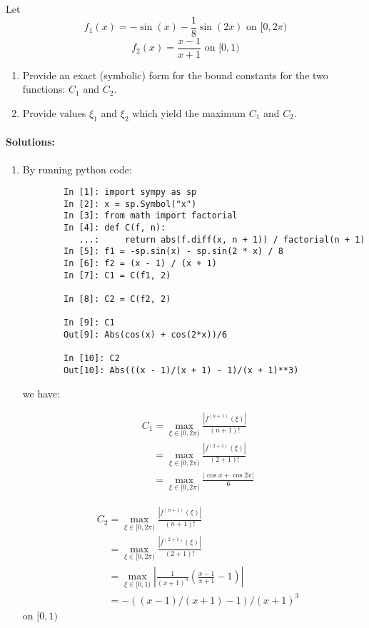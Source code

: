 \documentclass[11pt]{article}
\begin{document}
	Let \[f_1(x) = -\sin(x)-\frac{1}{8}\sin(2x) \textrm{\ on\ }[0, 2\pi)\]
		\[f_2(x) = \frac{x - 1}{x + 1}\textrm{\ on\ }[0, 1)\]
	\begin{enumerate}
		\item Provide an exact (symbolic) form for the bound constants for the two functions: $C_1$ and $C_2$.
		\item Provide values $\xi_1$ and $\xi_2$ which yield the maximum $C_1$ and $C_2$.
	\end{enumerate}
	
	\paragraph{Solutions:}
	\begin{enumerate}
		\item 
		By running python code:
		
		\begin{lstlisting}
		In [1]: import sympy as sp
		In [2]: x = sp.Symbol("x")
		In [3]: from math import factorial
		In [4]: def C(f, n):
   		   ...:     return abs(f.diff(x, n + 1)) / factorial(n + 1)
		In [5]: f1 = -sp.sin(x) - sp.sin(2 * x) / 8
		In [6]: f2 = (x - 1) / (x + 1)
		In [7]: C1 = C(f1, 2)

		In [8]: C2 = C(f2, 2)

		In [9]: C1
		Out[9]: Abs(cos(x) + cos(2*x))/6

		In [10]: C2
		Out[10]: Abs(((x - 1)/(x + 1) - 1)/(x + 1)**3)
		\end{lstlisting}
		
		we have:

		\begin{align}
			&C_1 = \max_{\xi \in [0,2\pi)} \frac{|f^{(n + 1)}(\xi)|}{(n + 1)!}\nonumber\\
			&\phantom{C_1} = \max_{\xi \in [0,2\pi)} \frac{|f^{(2 + 1)}(\xi)|}{(2 + 1)!}\nonumber\\
			&\phantom{C_1} = \max_{\xi \in [0,2\pi)} \frac{|\cos{x} + \cos{2x}|}{6}\nonumber
		\end{align}
		
		\begin{align}
			&C_2 = \max_{\xi \in [0,2\pi)} \frac{|f^{(n + 1)}(\xi)|}{(n + 1)!}\nonumber\\
			&\phantom{C_2} = \max_{\xi \in [0,2\pi)} \frac{|f^{(2 + 1)}(\xi)|}{(2 + 1)!}\nonumber\\
			&\phantom{C_2} = \max_{\xi\in [0, 1)} \left\lvert \frac{1}{(x + 1)^3}\left(\frac{x - 1}{x + 1} - 1\right)\right\rvert\nonumber\\
			&\phantom{C_2} = -((x - 1)/(x + 1) - 1)/(x + 1)^3\nonumber
		\end{align}
		on $[0, 1)$
		

\end{enumerate}
\end{document}
